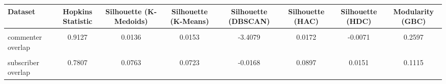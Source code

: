 \documentclass[border=1mm]{standalone}
\begin{document}
\begin{table}[!h]
\centering
\begin{tabular}{l|c|c|c|c|c|c|c}
\hline
Dataset & Hopkins Statistic & Silhouette (K-Medoids) & Silhouette (K-Means) & Silhouette (DBSCAN) & Silhouette (HAC) & Silhouette (HDC) & Modularity (GBC)\\
\hline
\cellcolor{gray!10}{commenter jaccard} & \cellcolor{gray!10}{0.9547} & \cellcolor{gray!10}{0.0075} & \cellcolor{gray!10}{0.0059} & \cellcolor{gray!10}{0.1305} & \cellcolor{gray!10}{0.0067} & \cellcolor{gray!10}{0.0033} & \cellcolor{gray!10}{0.3225}\\
\hline
commenter overlap & 0.9127 & 0.0136 & 0.0153 & -3.4079 & 0.0172 & -0.0071 & 0.2597\\
\hline
\cellcolor{gray!10}{subscriber jaccard} & \cellcolor{gray!10}{0.8563} & \cellcolor{gray!10}{0.0461} & \cellcolor{gray!10}{0.0137} & \cellcolor{gray!10}{-15.4830} & \cellcolor{gray!10}{0.0177} & \cellcolor{gray!10}{0.0396} & \cellcolor{gray!10}{0.1630}\\
\hline
subscriber overlap & 0.7807 & 0.0763 & 0.0723 & -0.0168 & 0.0897 & 0.0151 & 0.1115\\
\hline
\end{tabular}
\end{table}
\end{document}
